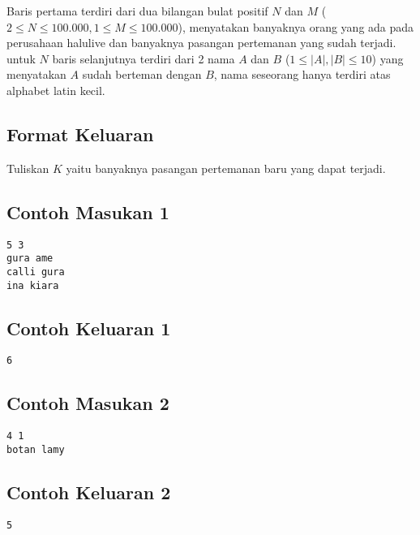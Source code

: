 \documentclass{article}
\begin{document}
Baris pertama terdiri dari dua bilangan bulat positif $N$ dan $M$ ($2 \leq N \leq 100.000,  1 \leq M \leq 100.000$), menyatakan banyaknya orang yang ada pada perusahaan halulive dan banyaknya pasangan pertemanan yang sudah terjadi.
untuk $N$ baris selanjutnya terdiri dari 2 nama $A$ dan $B$ ($1 \leq |A|,|B| \leq 10$) yang menyatakan $A$ sudah berteman dengan $B$, nama seseorang hanya terdiri atas alphabet latin kecil.

\subsection*{Format Keluaran}

Tuliskan $K$ yaitu banyaknya pasangan pertemanan baru yang dapat terjadi.

\begin{multicols}{2}
\subsection*{Contoh Masukan 1}
\begin{lstlisting}
5 3
gura ame
calli gura
ina kiara
\end{lstlisting}
\columnbreak
\subsection*{Contoh Keluaran 1}
\begin{lstlisting}
6
\end{lstlisting}
\vfill
\null
\end{multicols}

\begin{multicols}{2}
\subsection*{Contoh Masukan 2}
\begin{lstlisting}
4 1
botan lamy
\end{lstlisting}
\columnbreak
\subsection*{Contoh Keluaran 2}
\begin{lstlisting}
5
\end{lstlisting}
\vfill
\null
\end{multicols}
\end{document}
